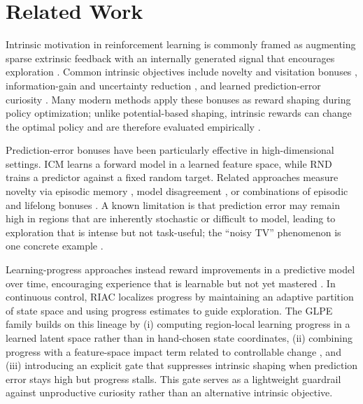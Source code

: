 \section{Related Work}
\label{sec:related_work}

Intrinsic motivation in reinforcement learning is commonly framed as augmenting sparse extrinsic feedback with an internally generated signal that encourages exploration \cite{singh-2004,barto-2012,oudeyer-2007A,oudeyer-2007B}.
Common intrinsic objectives include novelty and visitation bonuses \cite{bellemare-2016,tang-2016,ostrovski-2017}, information-gain and uncertainty reduction \cite{mohamed-2015,houthooft-2016}, and learned prediction-error curiosity \cite{stadie-2015,pathak-2017,burda-2018A,burda-2018B}.
Many modern methods apply these bonuses as reward shaping during policy optimization; unlike potential-based shaping, intrinsic rewards can change the optimal policy and are therefore evaluated empirically \cite{ng-1999}.

Prediction-error bonuses have been particularly effective in high-dimensional settings.
ICM \cite{pathak-2017} learns a forward model in a learned feature space, while RND \cite{burda-2018B} trains a predictor against a fixed random target.
Related approaches measure novelty via episodic memory \cite{savinov-2018}, model disagreement \cite{pathak-2019}, or combinations of episodic and lifelong bonuses \cite{badia-2020}.
A known limitation is that prediction error may remain high in regions that are inherently stochastic or difficult to model, leading to exploration that is intense but not task-useful; the ``noisy TV'' phenomenon is one concrete example \cite{mavor-parker-2021}.

Learning-progress approaches instead reward improvements in a predictive model over time, encouraging experience that is learnable but not yet mastered \cite{schmidhuber-1991,oudeyer-2007A}.
In continuous control, RIAC \cite{baranes-2009} localizes progress by maintaining an adaptive partition of state space and using progress estimates to guide exploration.
The GLPE family builds on this lineage by (i) computing region-local learning progress in a learned latent space rather than in hand-chosen state coordinates, (ii) combining progress with a feature-space impact term related to controllable change \cite{raileanu-2020}, and (iii) introducing an explicit gate that suppresses intrinsic shaping when prediction error stays high but progress stalls.
This gate serves as a lightweight guardrail against unproductive curiosity rather than an alternative intrinsic objective.
